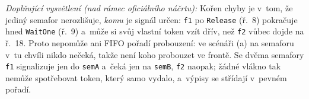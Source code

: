 \medskip
\noindent\textit{Doplňující vysvětlení (nad rámec oficiálního náčrtu):} Kořen chyby je v~tom, že
jediný semafor nerozlišuje, \emph{komu} je signál určen: \texttt{f1} po \texttt{Release} (ř.~8)
pokračuje hned \texttt{WaitOne} (ř.~9) a~může si svůj vlastní token vzít dřív, než \texttt{f2}
vůbec dojde na ř.~18. Proto nepomůže ani FIFO pořadí probouzení: ve scénáři (a) na semaforu v~tu
chvíli nikdo nečeká, takže není koho probouzet ve frontě. Se dvěma semafory \texttt{f1} signalizuje
jen do \texttt{semA} a~čeká jen na \texttt{semB}, \texttt{f2} naopak; žádné vlákno tak nemůže
spotřebovat token, který samo vydalo, a~výpisy se střídají v~pevném pořadí.
